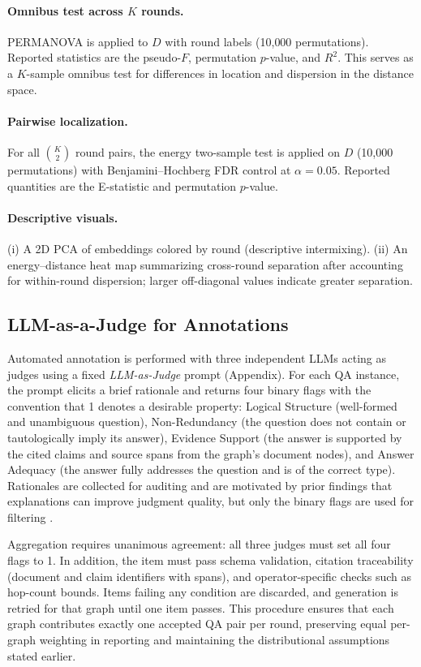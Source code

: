 \paragraph{Omnibus test across $K$ rounds.}
PERMANOVA is applied to $D$ with round labels (10{,}000 permutations). Reported statistics are the pseudo-$F$, permutation $p$-value, and $R^2$. This serves as a $K$-sample omnibus test for differences in location and dispersion in the distance space.

\paragraph{Pairwise localization.}
For all $\binom{K}{2}$ round pairs, the energy two-sample test is applied on $D$ (10{,}000 permutations) with Benjamini–Hochberg FDR control at $\alpha{=}0.05$. Reported quantities are the E-statistic and permutation $p$-value.



\paragraph{Descriptive visuals.}
(i) A 2D PCA of embeddings colored by round (descriptive intermixing).  
(ii) An energy–distance heat map summarizing cross-round separation after accounting for within-round dispersion; larger off-diagonal values indicate greater separation.

\subsection{LLM-as-a-Judge for Annotations}
\label{subsec:annotationLLM}

Automated annotation is performed with three independent LLMs acting as judges  using a fixed \emph{LLM-as-Judge} prompt (Appendix). For each QA instance, the prompt elicits a brief rationale and returns four binary flags with the convention that 1 denotes a desirable property: Logical Structure (well-formed and unambiguous question), Non-Redundancy (the question does not contain or tautologically imply its answer), Evidence Support (the answer is supported by the cited claims and source spans from the graph’s document nodes), and Answer Adequacy (the answer fully addresses the question and is of the correct type). Rationales are collected for auditing and are motivated by prior findings that explanations can improve judgment quality, but only the binary flags are used for filtering \cite{wei2022chain,kojima2022large}.

Aggregation requires unanimous agreement: all three judges must set all four flags to 1. In addition, the item must pass schema validation, citation traceability (document and claim identifiers with spans), and operator-specific checks such as hop-count bounds. Items failing any condition are discarded, and generation is retried for that graph until one item passes. This procedure ensures that each graph contributes exactly one accepted QA pair per round, preserving equal per-graph weighting in reporting and maintaining the distributional assumptions stated earlier.